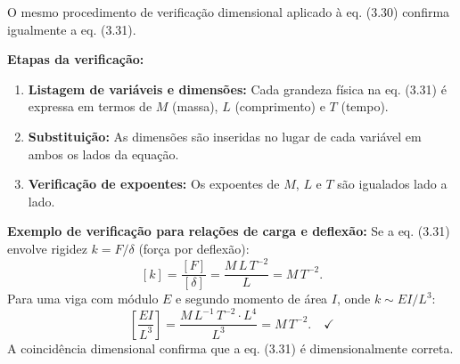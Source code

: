 O mesmo procedimento de verificação dimensional aplicado à eq. (3.30) confirma igualmente a eq. (3.31).

\textbf{Etapas da verificação:}
\begin{enumerate}
\item \textbf{Listagem de variáveis e dimensões:} Cada grandeza física na eq. (3.31) é expressa em termos de $M$ (massa), $L$ (comprimento) e $T$ (tempo).
\item \textbf{Substituição:} As dimensões são inseridas no lugar de cada variável em ambos os lados da equação.
\item \textbf{Verificação de expoentes:} Os expoentes de $M$, $L$ e $T$ são igualados lado a lado.
\end{enumerate}

\textbf{Exemplo de verificação para relações de carga e deflexão:}
Se a eq. (3.31) envolve rigidez $k = F/\delta$ (força por deflexão):
\[
[k] = \frac{[F]}{[\delta]} = \frac{M\,L\,T^{-2}}{L} = M\,T^{-2}.
\]
Para uma viga com módulo $E$ e segundo momento de área $I$, onde $k \sim EI/L^3$:
\[
\left[\frac{EI}{L^3}\right] = \frac{M\,L^{-1}\,T^{-2}\cdot L^4}{L^3} = M\,T^{-2}.\quad\checkmark
\]
A coincidência dimensional confirma que a eq. (3.31) é dimensionalmente correta.

